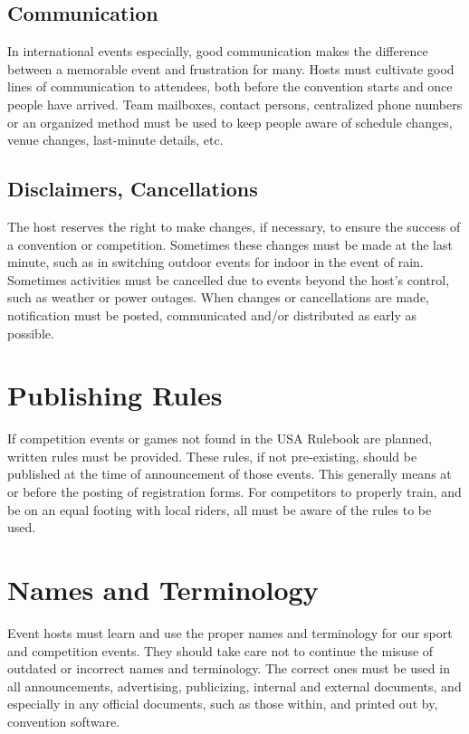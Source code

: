 \subsection{Communication}
In international events especially, good communication makes the difference between a memorable event and frustration for many. 
Hosts must cultivate good lines of communication to attendees, both before the convention starts and once people have arrived. 
Team mailboxes, contact persons, centralized phone numbers or an organized method must be used to keep people aware of schedule changes, venue changes, last-minute details, etc.

\subsection{Disclaimers, Cancellations}
The host reserves the right to make changes, if necessary, to ensure the success of a convention or competition. 
Sometimes these changes must be made at the last minute, such as in switching outdoor events for indoor in the event of rain. 
Sometimes activities must be cancelled due to events beyond the host's control, such as weather or power outages. 
When changes or cancellations are made, notification must be posted, communicated and/or distributed as early as possible.

\section{Publishing Rules}
If competition events or games not found in the USA Rulebook are planned, written rules must be provided. 
These rules, if not pre-existing, should be published at the time of announcement of those events. 
This generally means at or before the posting of registration forms. 
For competitors to properly train, and be on an equal footing with local riders, all must be aware of the rules to be used.

\section{Names and Terminology}
Event hosts must learn and use the proper names and terminology for our sport and competition events. 
They should take care not to continue the misuse of outdated or incorrect names and terminology. 
The correct ones must be used in all announcements, advertising, publicizing, internal and external documents, and especially in any official documents, such as those within, and printed out by, convention software.


